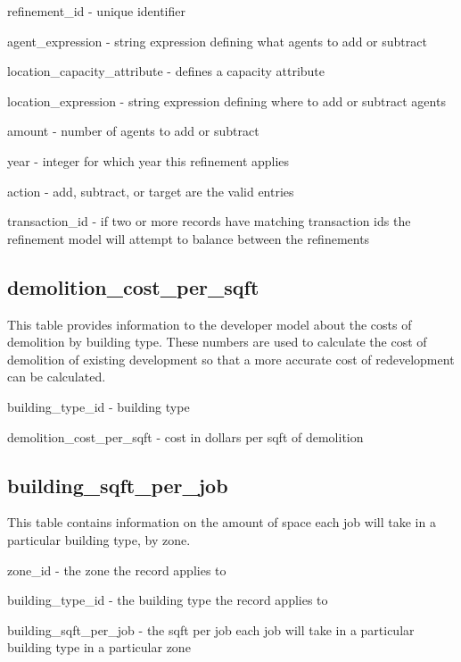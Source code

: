 \begin{description}
\item refinement\_id - unique identifier
\item agent\_expression - string expression defining what agents to add or subtract
\item location\_capacity\_attribute - defines a capacity attribute
\item location\_expression - string expression defining where to add or subtract agents
\item amount - number of agents to add or subtract
\item year - integer for which year this refinement applies
\item action - add, subtract, or target are the valid entries
\item transaction\_id - if two or more records have matching transaction ids the refinement model will attempt to balance between the refinements 
\end{description}

\subsection{demolition\_cost\_per\_sqft} 

This table provides information to the developer model about the costs of demolition by building type. These numbers are used to calculate the cost of demolition of existing development so that a more accurate cost of redevelopment can be calculated.

\begin{description}
\item building\_type\_id - building type
\item demolition\_cost\_per\_sqft - cost in dollars per sqft of demolition 
\end{description}

\subsection{building\_sqft\_per\_job} 

This table contains information on the amount of space each job will take in a particular building type, by zone.

\begin{description}
\item zone\_id - the zone the record applies to
\item building\_type\_id - the building type the record applies to
\item building\_sqft\_per\_job - the sqft per job each job will take in a particular building type in a particular zone 
\end{description}

